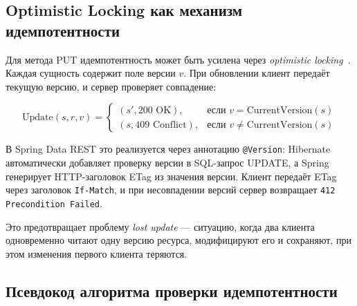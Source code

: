 \subsection{Optimistic Locking как механизм идемпотентности}

Для метода PUT идемпотентность может быть усилена через \emph{optimistic locking}~\cite{fowler2002patterns}. Каждая сущность содержит поле версии $v$. При обновлении клиент передаёт текущую версию, и сервер проверяет совпадение:

\begin{equation}
    \text{Update}(s, r, v) =
    \begin{cases}
        (s', \text{200 OK}), & \text{если } v = \text{CurrentVersion}(s) \\
        (s, \text{409 Conflict}), & \text{если } v \neq \text{CurrentVersion}(s)
    \end{cases}
\end{equation}

В Spring Data REST это реализуется через аннотацию \texttt{@Version}: Hibernate автоматически добавляет проверку версии в SQL-запрос UPDATE, а Spring генерирует HTTP-заголовок ETag из значения версии. Клиент передаёт ETag через заголовок \texttt{If-Match}, и при несовпадении версий сервер возвращает \texttt{412 Precondition Failed}.

Это предотвращает проблему \emph{lost update} --- ситуацию, когда два клиента одновременно читают одну версию ресурса, модифицируют его и сохраняют, при этом изменения первого клиента теряются.

\subsection{Псевдокод алгоритма проверки идемпотентности}

